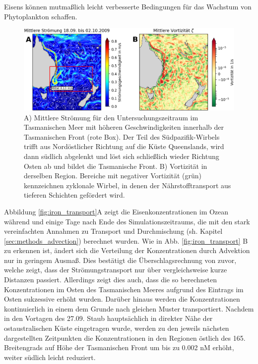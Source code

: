 \documentclass[12pt,a4paper,onecolumn,headheight=30pt]{scrartcl}
\begin{document}
Eisens können mutmaßlich leicht verbesserte Bedingungen für das Wachstum von Phytoplankton schaffen.
\begin{figure}[htbp]
\includegraphics[width=\textwidth]{bilder/currents_mean.png}
\caption{A) Mittlere Strömung für den Untersuchungszeitraum im Tasmanischen Meer mit höheren Geschwindigkeiten innerhalb der Tasmanischen Front (rote Box). Der Teil des Südpazifik-Wirbels trifft aus Nordöstlicher Richtung auf die Küste Queenslands, wird dann südlich abgelenkt und löst sich schließlich wieder Richtung Osten ab und bildet die Tasmanische Front. B) Vortizität in derselben Region. Bereiche mit negativer Vortizität (grün) kennzeichnen zyklonale Wirbel, in denen der Nährstofftransport aus tieferen Schichten gefördert wird. } \label{fig:tasman_current}
\end{figure}
Abbildung \ref{fig:iron_transport}A zeigt die Eisenkonzentrationen im Ozean während und einige Tage nach Ende des Simulationszeitraums, die mit den stark vereinfachten Annahmen zu Transport und Durchmischung (sh. Kapitel \ref{sec:methods_advection}) berechnet wurden. Wie in Abb. \ref{fig:iron_transport} B zu erkennen ist, ändert sich die Verteilung der Konzentrationen durch Advektion nur in geringem Ausmaß. Dies bestätigt die Überschlagsrechnung von zuvor, welche zeigt, dass der Strömungstransport nur über vergleichsweise kurze Distanzen passiert. Allerdings zeigt dies auch, dass die so berechneten Konzentrationen im Osten des Tasmanischen Meeres aufgrund des Eintrags im Osten sukzessive erhöht wurden. Darüber hinaus werden die Konzentrationen kontinuierlich in einem dem Grunde nach gleichen Muster transportiert. Nachdem in den Vortagen des 27.09. Staub hauptsächlich in direkter Nähe der ostaustralischen Küste eingetragen wurde, werden zu den jeweils nächsten dargestellten Zeitpunkten die Konzentrationen in den Regionen östlich des 165. Breitengrads auf Höhe der Tasmanischen Front um bis zu 0.002 nM erhöht, weiter südlich leicht reduziert.
\end{document}
